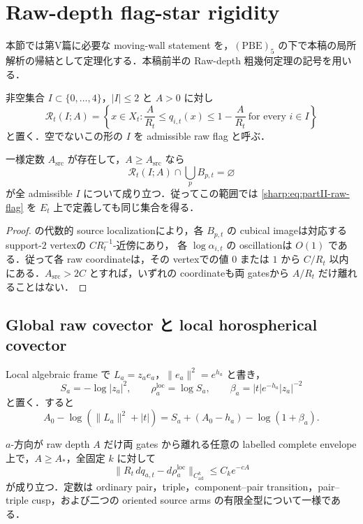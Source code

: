 \documentclass[a4paper,11pt]{ltjsarticle}
\numberwithin{equation}{section}
\theoremstyle{plain}
\theoremstyle{definition}
\theoremstyle{remark}
\begin{document}
\section{Raw-depth flag-star rigidity}\label{sharp:sec:partII-raw-flag-star}
本節では第V篇に必要な moving-wall statement を，$\mathrm{(PBE)}_5$ の下で本稿の局所解析の帰結として定理化する．本稿前半の Raw-depth 粗幾何定理の記号を用いる．

\begin{definition}\label{sharp:def:partII-raw-flag}
非空集合 $I\subset\{0,\ldots,4\}$，$|I|\le2$ と $A>0$ に対し
\begin{equation}\label{sharp:eq:partII-raw-flag}
 \mathcal R_t(I;A)=
 \left\{x\in X_t:\frac{A}{R_t}\le q_{i,t}(x)\le1-\frac{A}{R_t}
 \ \text{for every }i\in I\right\}
\end{equation}
と置く．空でないこの形の $I$ を admissible raw flag と呼ぶ．
\end{definition}

\begin{lemma}\label{sharp:lem:partII-source-exclusion}
一様定数 $A_{\mathrm{src}}$ が存在して，$A\ge A_{\mathrm{src}}$ なら
\[
 \mathcal R_t(I;A)\cap\bigcup_p B_{p,t}=\varnothing
\]
が全 admissible $I$ について成り立つ．従ってこの範囲では \eqref{sharp:eq:partII-raw-flag} を $E_t$ 上で定義しても同じ集合を得る．
\end{lemma}

\begin{proof}
 の代数的 source localizationにより，各 $B_{p,t}$ の cubical imageは対応する support-$2$ vertexの $CR_t^{-1}$-近傍にあり，
各 $\log\alpha_{i,t}$ の oscillationは $O(1)$ である．従って各 raw coordinateは，その vertexでの値 $0$ または $1$ から
$C/R_t$ 以内にある．$A_{\mathrm{src}}>2C$ とすれば，いずれの coordinateも両 gatesから $A/R_t$ だけ離れることはない．
\end{proof}

\subsection{Global raw covector と local horospherical covector}
Local algebraic frame で $L_a=z_a e_a$，$\|e_a\|^2=e^{h_a}$ と書き，
\[
 S_a=-\log|z_a|^2,\qquad \rho_a^{\mathrm{loc}}=\log S_a,
 \qquad \beta_a=|t|e^{-h_a}|z_a|^{-2}
\]
と置く．すると
\[
 A_0-\log(\|L_a\|^2+|t|)
 =S_a+(A_0-h_a)-\log(1+\beta_a).
\]

\begin{lemma}\label{sharp:lem:partII-raw-local-covector}
$a$-方向が raw depth $A$ だけ両 gates から離れる任意の labelled complete envelope 上で，$A\ge A_*$，全固定 $k$ に対して
\[
 \bigl\|R_t\,dq_{a,t}-d\rho_a^{\mathrm{loc}}\bigr\|_{C^k_{\mathrm{ad}}}
 \le C_k e^{-cA}
\]
が成り立つ．定数は ordinary pair，triple，component--pair transition，pair--triple cusp，および二つの oriented source arms の有限全型について一様である．
\end{lemma}
\end{document}
